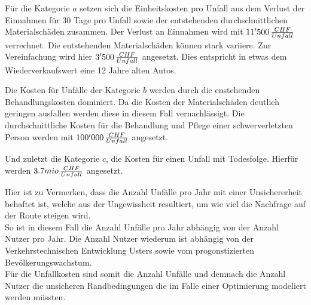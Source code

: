 \begin{IMleftrightskip}
Für die Kategorie $a$ setzen sich die Einheitskosten pro Unfall aus dem Verlust der Einnahmen für 30 Tage pro Unfall sowie der entstehenden durchschnittlichen Materialschäden zusammen. Der Verlust an Einnahmen wird mit $11'500 \thinspace \frac{CHF}{Unfall}$ verrechnet. Die entstehenden Materialschäden können stark variiere. Zur Vereinfachung wird hier $3'500 \thinspace \frac{CHF}{Unfall}$ angesetzt. Dies entspricht in etwas dem Wiederverkaufswert eine 12 Jahre alten Autos.

Die Kosten für Unfälle der Kategorie $b$ werden durch die enstehenden Behandlungskosten dominiert. Da die Kosten der Materialschäden deutlich geringen ausfallen werden diese in diesem Fall vernachlässigt. Die durchschnittliche Kosten für die Behandlung und Pflege einer schwerverletzten Person werden mit $100'000 \thinspace \frac{CHF}{Unfall}$ angesetzt.

Und zuletzt die Kategorie $c$, die Kosten für einen Unfall mit Todesfolge. Hierfür werden $3.7mio \thinspace \frac{CHF}{Unfall}$ angesetzt. 
\end{IMleftrightskip}

Hier ist zu Vermerken, dass die Anzahl Unfälle pro Jahr mit einer Unsichererheit behaftet ist, welche aus der Ungewissheit resultiert, um wie viel die Nachfrage auf der Route steigen wird. \\ [2ex]
So ist in diesem Fall die Anzahl Unfälle pro Jahr abhängig von der Anzahl Nutzer pro Jahr. Die Anzahl Nutzer wiederum ist abhängig von der Verkehrstechnischen Entwicklung Usters sowie vom progonstizierten Bevölkerungswachstum. \\
Für die Unfallkosten sind somit die Anzahl Unfälle und demnach die Anzahl Nutzer die unsicheren Randbedingungen die im Falle einer Optimierung modeliert werden müssten.



%

